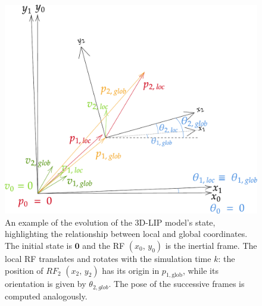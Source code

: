 \begin{figure}[h]
    \centering
    \includegraphics[width=0.75\linewidth]{figures/LIP/loc_to_glob_tfm2.pdf}
    \caption{An example of the evolution of the 3D-LIP model's state, highlighting the relationship between local and global coordinates. The initial state is $\mathbf{0}$ and the RF $(x_0,\, y_0)$ is the inertial frame. The local RF translates and rotates with the simulation time $k$: the position of $RF_2$ $(x_2,\, y_2)$ has its origin in $p_{1, \text{glob}}$, while its orientation is given by $\theta_{2, glob}$. The pose of the successive frames is computed analogously.}
    \label{fig:loc_to_glob_tfm}
\end{figure}

